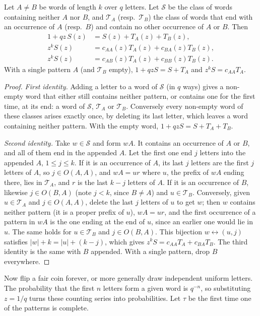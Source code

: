 \begin{theorem}\label{thm:guibas}
Let $A\ne B$ be words of length $k$ over $q$ letters. Let $\mathcal S$ be the class of words containing neither $A$ nor $B$, and $\mathcal T_A$ (resp.\ $\mathcal T_B$) the
class of words that end with an occurrence of $A$ (resp.\ $B$) and contain no other occurrence of $A$ or $B$. Then
\[
\begin{aligned}1+qz\,S(z)&=S(z)+T_A(z)+T_B(z),\\ z^kS(z)&=c_{AA}(z)T_A(z)+c_{BA}(z)T_B(z),\\ z^kS(z)&=c_{AB}(z)T_A(z)+c_{BB}(z)T_B(z).\end{aligned}
\]
With a single pattern $A$ (and $\mathcal T_B$ empty), $1+qzS=S+T_A$ and $z^kS=c_{AA}T_A$.
\end{theorem}
\begin{proof}
\emph{First identity.} Adding a letter to a word of $\mathcal S$ (in $q$ ways) gives a non-empty word that either still contains neither pattern, or
contains one for the first time, at its end: a word of $\mathcal S$, $\mathcal T_A$ or $\mathcal T_B$. Conversely every non-empty word of these classes arises exactly
once, by deleting its last letter, which leaves a word containing neither pattern. With the empty word, $1+qzS=S+T_A+T_B$.

\emph{Second identity.} Take $w\in\mathcal S$ and form $wA$. It contains an occurrence of $A$ or $B$, and all of them end in the appended $A$. Let the first
one end $j$ letters into the appended $A$, $1\le j\le k$. If it is an occurrence of $A$, its last $j$ letters are the first $j$ letters of $A$, so $j\in O(A,A)$,
and $wA=ur$ where $u$, the prefix of $wA$ ending there, lies in $\mathcal T_A$, and $r$ is the last $k-j$ letters of $A$. If it is an occurrence of $B$, likewise
$j\in O(B,A)$ (note $j<k$, since $B\ne A$) and $u\in\mathcal T_B$. Conversely, given $u\in\mathcal T_A$ and $j\in O(A,A)$, delete the last $j$ letters of $u$ to get $w$; then $w$
contains neither pattern (it is a proper prefix of $u$), $wA=ur$, and the first occurrence of a pattern in $wA$ is the one ending at the end of $u$,
since an earlier one would lie in $u$. The same holds for $u\in\mathcal T_B$ and $j\in O(B,A)$. This bijection $w\leftrightarrow(u,j)$ satisfies $|w|+k=|u|+(k-j)$, which
gives $z^kS=c_{AA}T_A+c_{BA}T_B$. The third identity is the same with $B$ appended. With a single pattern, drop $B$ everywhere.
\end{proof}

Now flip a fair coin forever, or more generally draw independent uniform letters. The probability that the first $n$ letters form a given
word is $q^{-n}$, so substituting $z=1/q$ turns these counting series into probabilities. Let $\tau$ be the first time one of the
patterns is complete.

